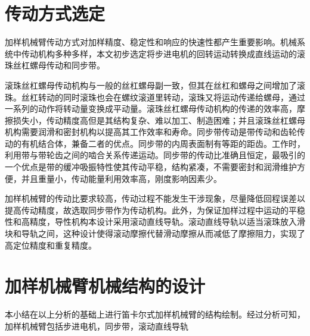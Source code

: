 \section{传动方式选定}
加样机械臂传动方式对加样精度、稳定性和响应的快速性都产生重要影响。机械系统中传动机构多种多样，本文初步选定将步进电机的回转运动转换成直线运动的滚珠丝杠螺母传动和同步带。

滚珠丝杠螺母传动机构与一般的丝杠螺母副一致，但其在丝杠和螺母之间增加了滚珠。丝杠转动的同时滚珠也会在螺纹滚道里转动，滚珠又将运动传递给螺母，通过一系列的动作将转动量变换成平动量。滚珠丝杠螺母传动机构的传递的效率高，摩擦损失小，传动精度高但是其结构复杂、难以加工、制造困难；并且滚珠丝杠螺母机构需要润滑和密封机构以提高其工作效率和寿命。同步带传动是带传动和齿轮传动的有机结合体，兼备二者的优点。同步带的内周表面制有等距的距齿。工作时，利用带与带轮齿之间的啮合关系传递运动\supercite{bib7}。同步带的传动比准确且恒定，最吸引的一个优点是带的缓冲吸振特性使其传动平稳，结构紧凑，不需要密封和润滑维护方便，并且重量小，传动能量利用效率高，刚度影响因素少。

加样机械臂的传动比要求较高，传动过程不能发生干涉现象，尽量降低回程误差以提高传动精度，故选取同步带作为传动机构。此外，为保证加样过程中运动的平稳性和高精度，导性机构本设计采用滚动直线导轨。滚动直线导轨以适当滚珠放入滑块和导轨之间，这种设计使得滚动摩擦代替滑动摩擦从而减低了摩擦阻力，实现了高定位精度和重复精度。


\section{加样机械臂机械结构的设计}
本小结在以上分析的基础上进行笛卡尔式加样机械臂的结构绘制。经过分析可知，加样机械臂包括步进电机，同步带，滚动直线导轨

